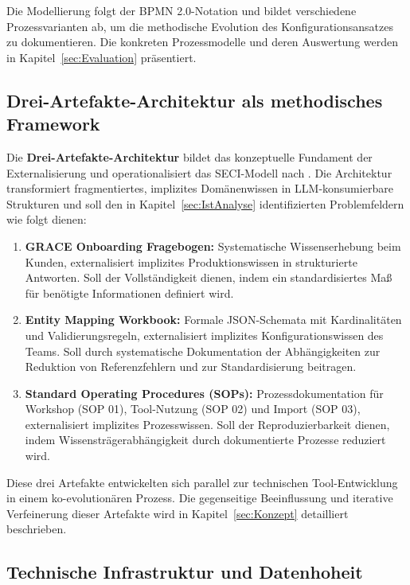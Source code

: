 Die Modellierung folgt der BPMN 2.0-Notation und bildet verschiedene Prozessvarianten ab, um die methodische Evolution des Konfigurationsansatzes zu dokumentieren. Die konkreten Prozessmodelle und deren Auswertung werden in Kapitel~\ref{sec:Evaluation} präsentiert.


\subsection{Drei-Artefakte-Architektur als methodisches Framework}
\label{subsec:DreiArtefakteArchitektur}

Die \textbf{Drei-Artefakte-Architektur} bildet das konzeptuelle Fundament der Externalisierung und operationalisiert das SECI-Modell nach \cite{nonaka:knowledge_creating_company1995}. Die Architektur transformiert fragmentiertes, implizites Domänenwissen in LLM-konsumierbare Strukturen und soll den in Kapitel~\ref{sec:IstAnalyse} identifizierten Problemfeldern wie folgt dienen:

\begin{enumerate}
    \item \textbf{GRACE Onboarding Fragebogen:} Systematische Wissenserhebung beim Kunden, externalisiert implizites Produktionswissen in strukturierte Antworten. Soll der Vollständigkeit dienen, indem ein standardisiertes Maß für benötigte Informationen definiert wird.

    \item \textbf{Entity Mapping Workbook:} Formale JSON-Schemata mit Kardinalitäten und Validierungsregeln, externalisiert implizites Konfigurationswissen des Teams. Soll durch systematische Dokumentation der Abhängigkeiten zur Reduktion von Referenzfehlern und zur Standardisierung beitragen.

    \item \textbf{Standard Operating Procedures (SOPs):} Prozessdokumentation für Workshop (SOP 01), Tool-Nutzung (SOP 02) und Import (SOP 03), externalisiert implizites Prozesswissen. Soll der Reproduzierbarkeit dienen, indem Wissensträgerabhängigkeit durch dokumentierte Prozesse reduziert wird.
\end{enumerate}

Diese drei Artefakte entwickelten sich parallel zur technischen Tool-Entwicklung in einem ko-evolutionären Prozess. Die gegenseitige Beeinflussung und iterative Verfeinerung dieser Artefakte wird in Kapitel~\ref{sec:Konzept} detailliert beschrieben.


\subsection{Technische Infrastruktur und Datenhoheit}
\label{subsec:TechnischeInfrastruktur}

